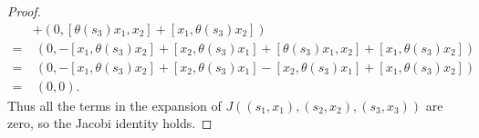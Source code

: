 \documentclass[12pt]{article}
\theoremstyle{definition}
\begin{document}
\begin{proof}
\begin{align*}
		                                  & + (0, [\theta(s_3)x_1, x_2] + [x_1, \theta(s_3)x_2])                                                  \\
		=                                 & \ (0, -[x_1, \theta(s_3)x_2] + [x_2, \theta(s_3)x_1] + [\theta(s_3)x_1, x_2] + [x_1, \theta(s_3)x_2]) \\
		=                                 & \ (0, -[x_1, \theta(s_3)x_2] + [x_2, \theta(s_3)x_1] - [x_2, \theta(s_3)x_1] + [x_1, \theta(s_3)x_2]) \\
    =                                 & \ (0, 0).
	\end{align*}
  Thus all the terms in the expansion of $J((s_1, x_1), (s_2, x_2), (s_3, x_3))$ are zero, so the Jacobi identity holds.
\end{proof}
\end{document}
